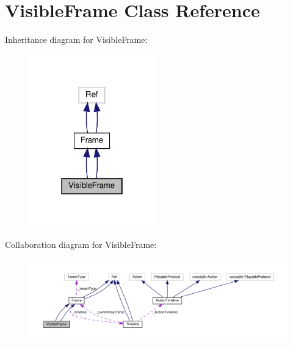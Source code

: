\hypertarget{classVisibleFrame}{}\section{Visible\+Frame Class Reference}
\label{classVisibleFrame}


Inheritance diagram for Visible\+Frame\+:
\nopagebreak
\begin{figure}[H]
\begin{center}
\leavevmode
\includegraphics[width=154pt]{classVisibleFrame__inherit__graph}
\end{center}
\end{figure}


Collaboration diagram for Visible\+Frame\+:
\nopagebreak
\begin{figure}[H]
\begin{center}
\leavevmode
\includegraphics[width=350pt]{classVisibleFrame__coll__graph}
\end{center}
\end{figure}
